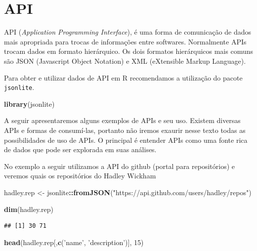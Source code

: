 \documentclass[]{book}
\newenvironment{Shaded}{\begin{snugshade}}{\end{snugshade}}
\newcommand{\KeywordTok}[1]{\textcolor[rgb]{0.13,0.29,0.53}{\textbf{#1}}}
\newcommand{\DecValTok}[1]{\textcolor[rgb]{0.00,0.00,0.81}{#1}}
\newcommand{\StringTok}[1]{\textcolor[rgb]{0.31,0.60,0.02}{#1}}
\newcommand{\OperatorTok}[1]{\textcolor[rgb]{0.81,0.36,0.00}{\textbf{#1}}}
\newcommand{\NormalTok}[1]{#1}
\begin{document}
\section{API}\label{api}

API (\emph{Application Programming Interface}), é uma forma de
comunicação de dados mais apropriada para trocas de informações entre
softwares. Normalmente APIs trocam dados em formato hierárquico. Os dois
formatos hierárquicos mais comuns são JSON (Javascript Object Notation)
e XML (eXtensible Markup Language).

Para obter e utilizar dados de API em R recomendamos a utilização do
pacote \texttt{jsonlite}.

\begin{Shaded}
\begin{Highlighting}[]
\KeywordTok{library}\NormalTok{(jsonlite)}
\end{Highlighting}
\end{Shaded}

A seguir apresentaremos alguns exemplos de APIs e seu uso. Existem
diversas APIs e formas de consumí-las, portanto não iremos exaurir nesse
texto todas as possibilidades de uso de APIs. O principal é entender
APIs como uma fonte rica de dados que pode ser explorada em suas
análises.

No exemplo a seguir utilizamos a API do github (portal para
repositórios) e veremos quais os repositórios do Hadley Wickham

\begin{Shaded}
\begin{Highlighting}[]
\NormalTok{hadley.rep <-}\StringTok{ }\NormalTok{jsonlite}\OperatorTok{::}\KeywordTok{fromJSON}\NormalTok{(}\StringTok{"https://api.github.com/users/hadley/repos"}\NormalTok{)}

\KeywordTok{dim}\NormalTok{(hadley.rep)}
\end{Highlighting}
\end{Shaded}

\begin{verbatim}
## [1] 30 71
\end{verbatim}

\begin{Shaded}
\begin{Highlighting}[]
\KeywordTok{head}\NormalTok{(hadley.rep[,}\KeywordTok{c}\NormalTok{(}\StringTok{'name'}\NormalTok{, }\StringTok{'description'}\NormalTok{)], }\DecValTok{15}\NormalTok{)}
\end{Highlighting}
\end{Shaded}
\end{document}
